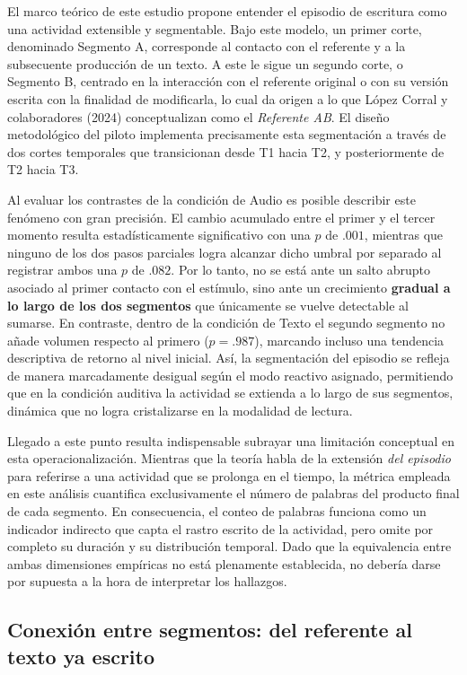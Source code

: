 \documentclass[12pt]{article}
\begin{document}
	El marco teórico de este estudio propone entender el episodio de escritura como una actividad extensible y segmentable. Bajo este modelo, un primer corte, denominado Segmento A, corresponde al contacto con el referente y a la subsecuente producción de un texto. A este le sigue un segundo corte, o Segmento B, centrado en la interacción con el referente original o con su versión escrita con la finalidad de modificarla, lo cual da origen a lo que López Corral y colaboradores (2024) conceptualizan como el \emph{Referente AB}. El diseño metodológico del piloto implementa precisamente esta segmentación a través de dos cortes temporales que transicionan desde T1 hacia T2, y posteriormente de T2 hacia T3.
	
	Al evaluar los contrastes de la condición de Audio es posible describir este fenómeno con gran precisión. El cambio acumulado entre el primer y el tercer momento resulta estadísticamente significativo con una $p$ de $.001$, mientras que ninguno de los dos pasos parciales logra alcanzar dicho umbral por separado al registrar ambos una $p$ de $.082$. Por lo tanto, no se está ante un salto abrupto asociado al primer contacto con el estímulo, sino ante un crecimiento \textbf{gradual a lo largo de los dos segmentos} que únicamente se vuelve detectable al sumarse. En contraste, dentro de la condición de Texto el segundo segmento no añade volumen respecto al primero ($p = .987$), marcando incluso una tendencia descriptiva de retorno al nivel inicial. Así, la segmentación del episodio se refleja de manera marcadamente desigual según el modo reactivo asignado, permitiendo que en la condición auditiva la actividad se extienda a lo largo de sus segmentos, dinámica que no logra cristalizarse en la modalidad de lectura.
	
	Llegado a este punto resulta indispensable subrayar una limitación conceptual en esta operacionalización. Mientras que la teoría habla de la extensión \emph{del episodio} para referirse a una actividad que se prolonga en el tiempo, la métrica empleada en este análisis cuantifica exclusivamente el número de palabras del producto final de cada segmento. En consecuencia, el conteo de palabras funciona como un indicador indirecto que capta el rastro escrito de la actividad, pero omite por completo su duración y su distribución temporal. Dado que la equivalencia entre ambas dimensiones empíricas no está plenamente establecida, no debería darse por supuesta a la hora de interpretar los hallazgos.
	
	\subsection{Conexión entre segmentos: del referente al texto ya escrito}
	
\end{document}
